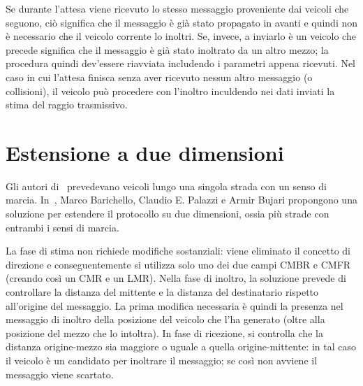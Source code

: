 Se durante l'attesa viene ricevuto lo stesso messaggio proveniente dai veicoli che seguono, ciò significa che il messaggio è già stato propagato in avanti e quindi non è necessario
che il veicolo corrente lo inoltri.
Se, invece, a inviarlo è un veicolo che precede significa che il messaggio è già stato inoltrato da un altro mezzo; la procedura quindi dev'essere riavviata includendo i parametri appena ricevuti.
Nel caso in cui l'attesa finisca senza aver ricevuto nessun altro messaggio (o collisioni), il veicolo può procedere con l'inoltro inculdendo nei dati inviati la stima del raggio trasmissivo.
%
\section{Estensione a due dimensioni}
Gli autori di~\cite{Palazzi07howdo} prevedevano veicoli lungo una singola strada con un senso di marcia.
In~\cite{Barichello2017propagazione}, Marco Barichello, Claudio E. Palazzi e Armir Bujari propongono una soluzione per estendere il protocollo su due dimensioni,
ossia più strade con entrambi i sensi di marcia.

La fase di stima non richiede modifiche sostanziali: viene eliminato il concetto di direzione e conseguentemente si utilizza solo uno dei due campi CMBR e CMFR
(creando così un CMR e un LMR).
Nella fase di inoltro, la soluzione prevede di controllare la distanza del mittente e la distanza del destinatario rispetto all'origine del messaggio.
La prima modifica necessaria è quindi la presenza nel messaggio di inoltro della posizione del veicolo che l'ha generato (oltre alla posizione del mezzo che lo intoltra).
In fase di ricezione, si controlla che la distanza origine-mezzo sia maggiore o uguale a quella origine-mittente: in tal caso il veicolo è un candidato per inoltrare il messaggio;
se così non avviene il messaggio viene scartato.
%
